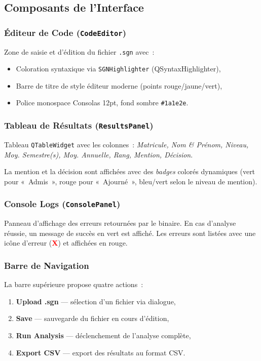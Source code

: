 \documentclass[a4paper,12pt]{article}
\begin{document}
\subsection{Composants de l'Interface}

\subsubsection{Éditeur de Code (\texttt{CodeEditor})}
Zone de saisie et d'édition du fichier \texttt{.sgn} avec~:
\begin{itemize}[leftmargin=1.5em]
  \item Coloration syntaxique via \texttt{SGNHighlighter} (QSyntaxHighlighter),
  \item Barre de titre de style éditeur moderne (points rouge/jaune/vert),
  \item Police monospace Consolas 12pt, fond sombre \texttt{\#1a1e2e}.
\end{itemize}

\subsubsection{Tableau de Résultats (\texttt{ResultsPanel})}
Tableau \texttt{QTableWidget} avec les colonnes~:
\textit{Matricule, Nom \& Prénom, Niveau, Moy. Semestre(s), Moy. Annuelle, Rang, Mention, Décision}.

La mention et la décision sont affichées avec des \textit{badges} colorés dynamiques (vert pour «~Admis~», rouge pour «~Ajourné~», bleu/vert selon le niveau de mention).

\subsubsection{Console Logs (\texttt{ConsolePanel})}
Panneau d'affichage des erreurs retournées par le binaire. En cas d'analyse réussie, un message de succès en vert est affiché. Les erreurs sont listées avec une icône d'erreur (\textcolor{red}{\textbf{X}}) et affichées en rouge.

\subsubsection{Barre de Navigation}
La barre supérieure propose quatre actions~:
\begin{enumerate}[leftmargin=1.5em]
  \item \textbf{Upload .sgn} — sélection d'un fichier via dialogue,
  \item \textbf{Save} — sauvegarde du fichier en cours d'édition,
  \item \textbf{Run Analysis} — déclenchement de l'analyse complète,
  \item \textbf{Export CSV} — export des résultats au format CSV.
\end{enumerate}
\end{document}
